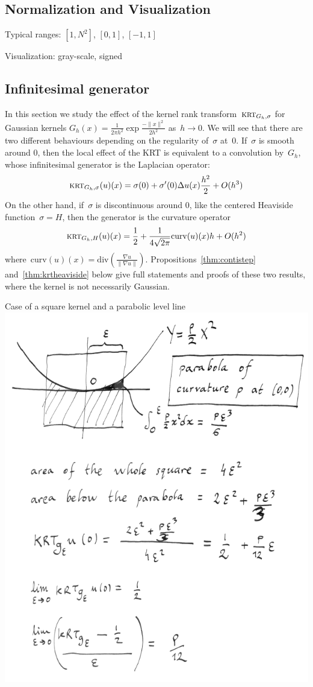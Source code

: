 \documentclass[12pt]{article}                  %
\begin{document}
\subsection{Normalization and Visualization}

Typical ranges: $[1,N^2]$, $[0,1]$, $[-1,1]$

Visualization: gray-scale, signed

\subsection{Infinitesimal generator}

In this section we study the effect of the kernel rank
transform~$\textsc{krt}_{G_h,\sigma}$ for Gaussian kernels
$G_h(x)=\frac1{2\pi h^2}\exp\frac{-\|x\|^2}{2h^2}$ as~$h\to 0$.
We will see that there are two different behaviours depending on the
regularity of~$\sigma$ at~$0$.  If~$\sigma$ is smooth around 0, then the
local effect of the KRT is equivalent to a convolution by~$G_h$, whose infinitesimal
generator is the Laplacian operator:
\begin{equation}\label{eq:localsmooth}
	\textsc{krt}_{G_h,\sigma}(u)(x)=\sigma(0)+\sigma'(0)\Delta u(x)\frac{h^2}2+O(h^3)
\end{equation}
On the other hand, if~$\sigma$ is discontinuous around 0, like
the centered Heaviside function~$\sigma=H$, then the generator is the curvature
operator
\begin{equation}\label{eq:localheaviside}
	\textsc{krt}_{G_h,H}(u)(x)=\frac12+\frac1{4\sqrt{2\pi}}\mathrm{curv}(u)(x)h+O(h^2)
\end{equation}
where~$\mathrm{curv}(u)(x)=\mathrm{div}\left(\frac{\nabla u}{\|\nabla
u\|}\right)$.  
Propositions~\ref{thm:contistep} and~\ref{thm:krtheaviside}
below give full statements and proofs of these two results, where the kernel
is not necessarily Gaussian.




Case of a square kernel and a parabolic level line\\
\includegraphics[width=0.6\linewidth]{f/pcurv.png}
\end{document}
